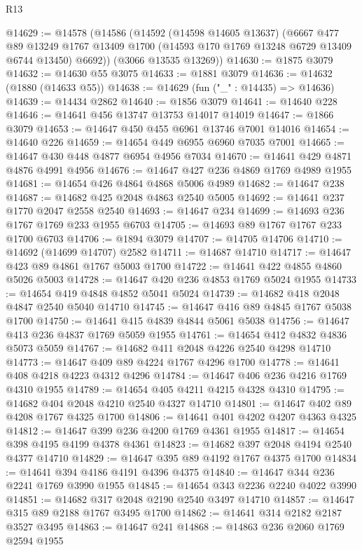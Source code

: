 \begin{lexlean}{R13}
\begin{coremodule}
@14629 := @14578
    (@14586
      (@14592
        (@14598 @14605 @13637)
        (@6667
          @477
          @89
          @13249
          @1767
          @13409
          @1700
          (@14593 @170 @1769 @13248 @6729 @13409 @6744 @13450)
          @6692))
      (@3066 @13535 @13269))
@14630 := @1875 @3079
@14632 := @14630 @55 @3075
@14633 := @1881 @3079
@14636 := @14632 (@1880 (@14633 @55))
@14638 := @14629 (fun ("_" : @14435) => @14636)
@14639 := @14434 @2862
@14640 := @1856 @3079
@14641 := @14640 @228
@14646 := @14641 @456 @13747 @13753 @14017 @14019
@14647 := @1866 @3079
@14653 := @14647 @450 @455 @6961 @13746 @7001 @14016
@14654 := @14640 @226
@14659 := @14654 @449 @6955 @6960 @7035 @7001
@14665 := @14647 @430 @448 @4877 @6954 @4956 @7034
@14670 := @14641 @429 @4871 @4876 @4991 @4956
@14676 := @14647 @427 @236 @4869 @1769 @4989 @1955
@14681 := @14654 @426 @4864 @4868 @5006 @4989
@14682 := @14647 @238
@14687 := @14682 @425 @2048 @4863 @2540 @5005
@14692 := @14641 @237 @1770 @2047 @2558 @2540
@14693 := @14647 @234
@14699 := @14693 @236 @1767 @1769 @233 @1955 @6703
@14705 := @14693 @89 @1767 @1767 @233 @1700 @6703
@14706 := @1894 @3079
@14707 := @14705 @14706
@14710 := @14692 (@14699 @14707) @2582
@14711 := @14687 @14710
@14717 := @14647 @423 @89 @4861 @1767 @5003 @1700
@14722 := @14641 @422 @4855 @4860 @5026 @5003
@14728 := @14647 @420 @236 @4853 @1769 @5024 @1955
@14733 := @14654 @419 @4848 @4852 @5041 @5024
@14739 := @14682 @418 @2048 @4847 @2540 @5040 @14710
@14745 := @14647 @416 @89 @4845 @1767 @5038 @1700
@14750 := @14641 @415 @4839 @4844 @5061 @5038
@14756 := @14647 @413 @236 @4837 @1769 @5059 @1955
@14761 := @14654 @412 @4832 @4836 @5073 @5059
@14767 := @14682 @411 @2048 @4226 @2540 @4298 @14710
@14773 := @14647 @409 @89 @4224 @1767 @4296 @1700
@14778 := @14641 @408 @4218 @4223 @4312 @4296
@14784 := @14647 @406 @236 @4216 @1769 @4310 @1955
@14789 := @14654 @405 @4211 @4215 @4328 @4310
@14795 := @14682 @404 @2048 @4210 @2540 @4327 @14710
@14801 := @14647 @402 @89 @4208 @1767 @4325 @1700
@14806 := @14641 @401 @4202 @4207 @4363 @4325
@14812 := @14647 @399 @236 @4200 @1769 @4361 @1955
@14817 := @14654 @398 @4195 @4199 @4378 @4361
@14823 := @14682 @397 @2048 @4194 @2540 @4377 @14710
@14829 := @14647 @395 @89 @4192 @1767 @4375 @1700
@14834 := @14641 @394 @4186 @4191 @4396 @4375
@14840 := @14647 @344 @236 @2241 @1769 @3990 @1955
@14845 := @14654 @343 @2236 @2240 @4022 @3990
@14851 := @14682 @317 @2048 @2190 @2540 @3497 @14710
@14857 := @14647 @315 @89 @2188 @1767 @3495 @1700
@14862 := @14641 @314 @2182 @2187 @3527 @3495
@14863 := @14647 @241
@14868 := @14863 @236 @2060 @1769 @2594 @1955

\end{coremodule}
\end{lexlean}
